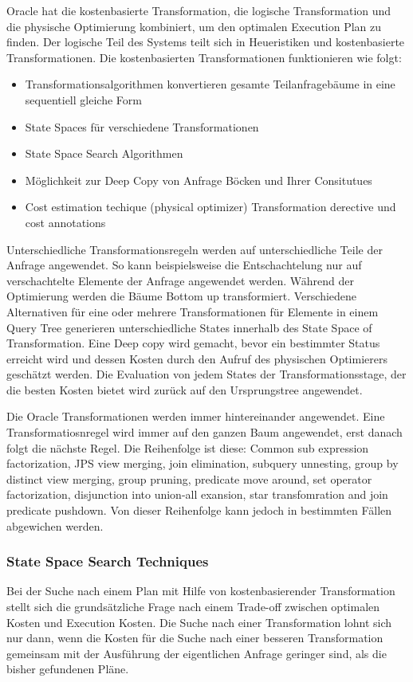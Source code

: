 Oracle hat die kostenbasierte Transformation, die logische Transformation und die physische Optimierung kombiniert, um den optimalen Execution Plan zu finden. Der logische Teil des Systems teilt sich in Heueristiken und kostenbasierte Transformationen. Die kostenbasierten Transformationen funktionieren wie folgt:

\begin{itemize}
\item Transformationsalgorithmen konvertieren gesamte Teilanfragebäume in eine sequentiell gleiche Form
\item State Spaces für verschiedene Transformationen
\item State Space Search Algorithmen
\item Möglichkeit zur Deep Copy von Anfrage Böcken und Ihrer Consitutues
\item Cost estimation techique (physical optimizer)
Transformation derective und cost annotations
\end{itemize}

Unterschiedliche Transformationsregeln werden auf unterschiedliche Teile der Anfrage angewendet. So kann beispielsweise die Entschachtelung nur auf verschachtelte Elemente der Anfrage angewendet werden. 
 Während der Optimierung werden die Bäume Bottom up transformiert. Verschiedene Alternativen für eine oder mehrere Transformationen für Elemente in einem Query Tree generieren unterschiedliche States innerhalb des State Space of Transformation. Eine Deep copy wird gemacht, bevor ein bestimmter Status erreicht wird und dessen Kosten durch den Aufruf des physischen Optimierers geschätzt werden. Die Evaluation von jedem States der Transformationsstage, der die besten Kosten bietet wird zurück auf den Ursprungstree angewendet.

Die Oracle Transformationen werden immer hintereinander angewendet. Eine Transformatiosnregel wird immer auf den ganzen Baum angewendet, erst danach folgt die nächste Regel. Die Reihenfolge ist diese: Common sub expression factorization, JPS view merging, join elimination, subquery unnesting, group by distinct view merging, group pruning, predicate move around, set operator factorization, disjunction into union-all exansion, star transfomration and join predicate pushdown. Von dieser Reihenfolge kann jedoch in bestimmten Fällen abgewichen werden. 



\subsubsection{State Space Search Techniques}
Bei der Suche nach einem Plan mit Hilfe von kostenbasierender Transformation stellt sich die grundsätzliche Frage nach einem Trade-off zwischen optimalen Kosten und Execution Kosten. Die Suche nach einer Transformation lohnt sich nur dann, wenn die Kosten für die Suche nach einer besseren Transformation gemeinsam mit der Ausführung der eigentlichen Anfrage geringer sind, als die bisher gefundenen Pläne.

